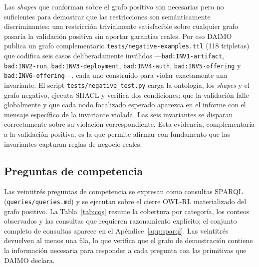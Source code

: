 \documentclass[Afour,sagev,times]{sagej}
\newcommand{\code}[1]{\texttt{#1}}
\begin{document}
Las \emph{shapes} que conforman sobre el grafo positivo son necesarias pero no suficientes para demostrar que las restricciones son semánticamente discriminantes: una restricción trivialmente satisfacible sobre cualquier grafo pasaría la validación positiva sin aportar garantías reales. Por eso DAIMO publica un grafo complementario \code{tests/negative-examples.ttl} (118 tripletas) que codifica seis casos deliberadamente inválidos ---\code{bad:INV1-artifact}, \code{bad:INV2-run}, \code{bad:INV3-deployment}, \code{bad:INV4-auth}, \code{bad:INV5-offering} y \code{bad:INV6-offering}---, cada uno construido para violar exactamente una invariante. El script \code{tests/negative\_test.py} carga la ontología, los \emph{shapes} y el grafo negativo, ejecuta SHACL y verifica dos condiciones: que la validación falle globalmente y que cada nodo focalizado esperado aparezca en el informe con el mensaje específico de la invariante violada. Las seis invariantes se disparan correctamente sobre su violación correspondiente. Esta evidencia, complementaria a la validación positiva, es la que permite afirmar con fundamento que las invariantes capturan reglas de negocio reales.

\subsection{Preguntas de competencia}\label{sec:eval-cqs}

Las veintitrés preguntas de competencia se expresan como consultas SPARQL (\code{queries/queries.md}) y se ejecutan sobre el cierre OWL-RL materializado del grafo positivo. La Tabla~\ref{tab:cqs} resume la cobertura por categoría, los conteos observados y las consultas que requieren razonamiento explícito; el conjunto completo de consultas aparece en el Apéndice~\ref{app:sparql}. Las veintitrés devuelven al menos una fila, lo que verifica que el grafo de demostración contiene la información necesaria para responder a cada pregunta con las primitivas que DAIMO declara.
\end{document}
